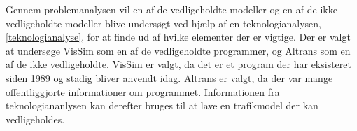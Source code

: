 \vspace{5mm}

Gennem problemanalysen vil en af de vedligeholdte modeller og en af de ikke vedligeholdte modeller blive undersøgt ved hjælp af en teknologianalysen, \ref{teknologianalyse}, for at finde ud af hvilke elementer der er vigtige. Der er valgt at undersøge VisSim som en af de vedligeholdte programmer, og Altrans som en af de ikke vedligeholdte. VisSim er valgt, da det er et program der har eksisteret siden 1989 og stadig bliver anvendt idag. Altrans er valgt, da der var mange offentliggjorte informationer om programmet. Informationen fra teknologiananlysen kan derefter bruges til at lave en trafikmodel der kan vedligeholdes.
